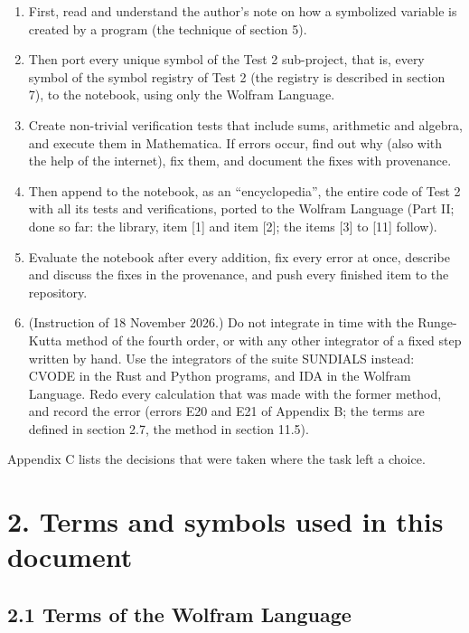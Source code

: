 \documentclass[
  10pt,
]{article}
\providecommand{\tightlist}{%
  \setlength{\itemsep}{0pt}\setlength{\parskip}{0pt}}
\begin{document}
\begin{enumerate}
\def\labelenumi{\arabic{enumi}.}
\tightlist
\item
  First, read and understand the author's note on how a symbolized
  variable is created by a program (the technique of section 5).
\item
  Then port every unique symbol of the Test 2 sub-project, that is,
  every symbol of the symbol registry of Test 2 (the registry is
  described in section 7), to the notebook, using only the Wolfram
  Language.
\item
  Create non-trivial verification tests that include sums, arithmetic
  and algebra, and execute them in Mathematica. If errors occur, find
  out why (also with the help of the internet), fix them, and document
  the fixes with provenance.
\item
  Then append to the notebook, as an ``encyclopedia'', the entire code
  of Test 2 with all its tests and verifications, ported to the Wolfram
  Language (Part II; done so far: the library, item {[}1{]} and item
  {[}2{]}; the items {[}3{]} to {[}11{]} follow).
\item
  Evaluate the notebook after every addition, fix every error at once,
  describe and discuss the fixes in the provenance, and push every
  finished item to the repository.
\item
  (Instruction of 18 November 2026.) Do not integrate in time with the
  Runge-Kutta method of the fourth order, or with any other integrator
  of a fixed step written by hand. Use the integrators of the suite
  SUNDIALS instead: CVODE in the Rust and Python programs, and IDA in
  the Wolfram Language. Redo every calculation that was made with the
  former method, and record the error (errors E20 and E21 of Appendix B;
  the terms are defined in section 2.7, the method in section 11.5).
\end{enumerate}

Appendix C lists the decisions that were taken where the task left a
choice.

\hypertarget{terms-and-symbols-used-in-this-document}{%
\section{2. Terms and symbols used in this
document}\label{terms-and-symbols-used-in-this-document}}

\hypertarget{terms-of-the-wolfram-language}{%
\subsection{2.1 Terms of the Wolfram
Language}\label{terms-of-the-wolfram-language}}
\end{document}
